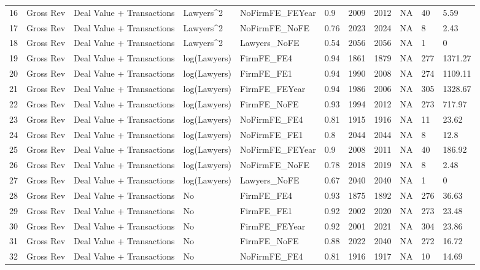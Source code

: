 \begin{table}[ht]
\begin{tabular}{rllllllllll}
  16 & Gross Rev & Deal Value + Transactions & Lawyers^2 & NoFirmFE\_FEYear & 0.9 & 2009 & 2012 & NA & 40 & 5.59 \\ 
  17 & Gross Rev & Deal Value + Transactions & Lawyers^2 & NoFirmFE\_NoFE & 0.76 & 2023 & 2024 & NA & 8 & 2.43 \\ 
  18 & Gross Rev & Deal Value + Transactions & Lawyers^2 & Lawyers\_NoFE & 0.54 & 2056 & 2056 & NA & 1 & 0 \\ 
  19 & Gross Rev & Deal Value + Transactions & log(Lawyers) & FirmFE\_FE4 & 0.94 & 1861 & 1879 & NA & 277 & 1371.27 \\ 
  20 & Gross Rev & Deal Value + Transactions & log(Lawyers) & FirmFE\_FE1 & 0.94 & 1990 & 2008 & NA & 274 & 1109.11 \\ 
  21 & Gross Rev & Deal Value + Transactions & log(Lawyers) & FirmFE\_FEYear & 0.94 & 1986 & 2006 & NA & 305 & 1328.67 \\ 
  22 & Gross Rev & Deal Value + Transactions & log(Lawyers) & FirmFE\_NoFE & 0.93 & 1994 & 2012 & NA & 273 & 717.97 \\ 
  23 & Gross Rev & Deal Value + Transactions & log(Lawyers) & NoFirmFE\_FE4 & 0.81 & 1915 & 1916 & NA & 11 & 23.62 \\ 
  24 & Gross Rev & Deal Value + Transactions & log(Lawyers) & NoFirmFE\_FE1 & 0.8 & 2044 & 2044 & NA & 8 & 12.8 \\ 
  25 & Gross Rev & Deal Value + Transactions & log(Lawyers) & NoFirmFE\_FEYear & 0.9 & 2008 & 2011 & NA & 40 & 186.92 \\ 
  26 & Gross Rev & Deal Value + Transactions & log(Lawyers) & NoFirmFE\_NoFE & 0.78 & 2018 & 2019 & NA & 8 & 2.48 \\ 
  27 & Gross Rev & Deal Value + Transactions & log(Lawyers) & Lawyers\_NoFE & 0.67 & 2040 & 2040 & NA & 1 & 0 \\ 
  28 & Gross Rev & Deal Value + Transactions & No & FirmFE\_FE4 & 0.93 & 1875 & 1892 & NA & 276 & 36.63 \\ 
  29 & Gross Rev & Deal Value + Transactions & No & FirmFE\_FE1 & 0.92 & 2002 & 2020 & NA & 273 & 23.48 \\ 
  30 & Gross Rev & Deal Value + Transactions & No & FirmFE\_FEYear & 0.92 & 2001 & 2021 & NA & 304 & 23.86 \\ 
  31 & Gross Rev & Deal Value + Transactions & No & FirmFE\_NoFE & 0.88 & 2022 & 2040 & NA & 272 & 16.72 \\ 
  32 & Gross Rev & Deal Value + Transactions & No & NoFirmFE\_FE4 & 0.81 & 1916 & 1917 & NA & 10 & 14.69 \\ 

\end{tabular}
\end{table}
